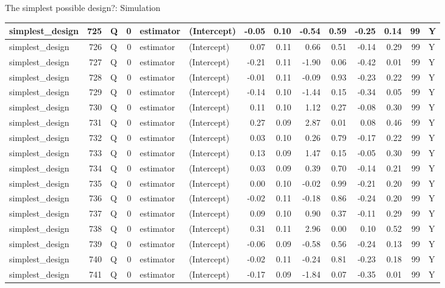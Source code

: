\documentclass[
  11pt,
  ignorenonframetext,
]{beamer}
\begin{document}
\begin{frame}[fragile]{The simplest possible design?: Simulation}
\begin{tabular}{l|r|l|r|l|l|r|r|r|r|r|r|r|l}
\hline
simplest\_design & 725 & Q & 0 & estimator & (Intercept) & -0.05 & 0.10 & -0.54 & 0.59 & -0.25 & 0.14 & 99 & Y\\
\hline
simplest\_design & 726 & Q & 0 & estimator & (Intercept) & 0.07 & 0.11 & 0.66 & 0.51 & -0.14 & 0.29 & 99 & Y\\
\hline
simplest\_design & 727 & Q & 0 & estimator & (Intercept) & -0.21 & 0.11 & -1.90 & 0.06 & -0.42 & 0.01 & 99 & Y\\
\hline
simplest\_design & 728 & Q & 0 & estimator & (Intercept) & -0.01 & 0.11 & -0.09 & 0.93 & -0.23 & 0.22 & 99 & Y\\
\hline
simplest\_design & 729 & Q & 0 & estimator & (Intercept) & -0.14 & 0.10 & -1.44 & 0.15 & -0.34 & 0.05 & 99 & Y\\
\hline
simplest\_design & 730 & Q & 0 & estimator & (Intercept) & 0.11 & 0.10 & 1.12 & 0.27 & -0.08 & 0.30 & 99 & Y\\
\hline
simplest\_design & 731 & Q & 0 & estimator & (Intercept) & 0.27 & 0.09 & 2.87 & 0.01 & 0.08 & 0.46 & 99 & Y\\
\hline
simplest\_design & 732 & Q & 0 & estimator & (Intercept) & 0.03 & 0.10 & 0.26 & 0.79 & -0.17 & 0.22 & 99 & Y\\
\hline
simplest\_design & 733 & Q & 0 & estimator & (Intercept) & 0.13 & 0.09 & 1.47 & 0.15 & -0.05 & 0.30 & 99 & Y\\
\hline
simplest\_design & 734 & Q & 0 & estimator & (Intercept) & 0.03 & 0.09 & 0.39 & 0.70 & -0.14 & 0.21 & 99 & Y\\
\hline
simplest\_design & 735 & Q & 0 & estimator & (Intercept) & 0.00 & 0.10 & -0.02 & 0.99 & -0.21 & 0.20 & 99 & Y\\
\hline
simplest\_design & 736 & Q & 0 & estimator & (Intercept) & -0.02 & 0.11 & -0.18 & 0.86 & -0.24 & 0.20 & 99 & Y\\
\hline
simplest\_design & 737 & Q & 0 & estimator & (Intercept) & 0.09 & 0.10 & 0.90 & 0.37 & -0.11 & 0.29 & 99 & Y\\
\hline
simplest\_design & 738 & Q & 0 & estimator & (Intercept) & 0.31 & 0.11 & 2.96 & 0.00 & 0.10 & 0.52 & 99 & Y\\
\hline
simplest\_design & 739 & Q & 0 & estimator & (Intercept) & -0.06 & 0.09 & -0.58 & 0.56 & -0.24 & 0.13 & 99 & Y\\
\hline
simplest\_design & 740 & Q & 0 & estimator & (Intercept) & -0.02 & 0.11 & -0.24 & 0.81 & -0.23 & 0.18 & 99 & Y\\
\hline
simplest\_design & 741 & Q & 0 & estimator & (Intercept) & -0.17 & 0.09 & -1.84 & 0.07 & -0.35 & 0.01 & 99 & Y\\

\end{tabular}
\end{frame}
\end{document}
